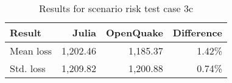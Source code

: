 \begin{table}[htbp]

\centering
\begin{tabular}{ l r r r }

\hline
\rowcolor{anti-flashwhite}
\bf{Result} & \bf{Julia} & \bf{OpenQuake} & \bf{Difference}\\
\hline
Mean loss & 1,202.46 & 1,185.37 & 1.42\% \\
Std. loss & 1,209.82 & 1,200.88 & 0.74\% \\
\hline
\end{tabular}

\caption{Results for scenario risk test case 3c}
\label{tab:result-sr-3c}
\end{table}
